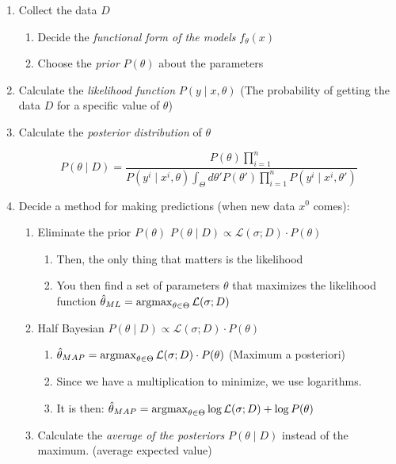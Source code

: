 \begin{enumerate}
	\item
	      Collect the data \(D\)

	      \begin{enumerate}
		      \item
		            Decide the \emph{functional form of the models} \(f_\theta (x)\)
		      \item
		            Choose the \emph{prior} \(P(\theta)\) about the parameters
	      \end{enumerate}
	\item
	      Calculate the \emph{likelihood function} \(P(y \mid x, \theta)\) (The
	      probability of getting the data \(D\) for a specific value of
	      \(\theta\))
	\item
	      Calculate the \emph{posterior distribution} of \(\theta\)

	      \[
		      P(\theta \mid D) = \frac{P(\theta) \prod_{i=1}^n}{P(y^i \mid x^i, \theta)
			      {\int_\Theta d\theta' P(\theta')\prod_{i=1}^n} P(y^i \mid x^i, \theta')}
	      \]

	\item
	      Decide a method for making predictions (when new data \(x^0\) comes):

	      \begin{enumerate}
		      \item Eliminate the prior \(P(\theta)\) \textrightarrow{}
		            \(P(\theta  \mid D) \propto \mathcal{L}(\sigma ; D) \cdot P(\theta)\)

		            \begin{enumerate}
			            \item
			                  Then, the only thing that matters is the likelihood
			            \item
			                  You then find a set of parameters \(\theta\) that maximizes the
			                  likelihood function
			                  \(\hat{\theta}_{ML} = \operatorname{argmax}_{\theta \in \Theta} \mathcal{L}(\sigma ; D)\)
		            \end{enumerate}
		      \item
		            Half Bayesian
		            \(P(\theta \mid D) \propto \mathcal{L}(\sigma ; D) \cdot P(\theta)\)

		            \begin{enumerate}
			            \item
			                  \(\hat{\theta}_{MAP} = \operatorname{argmax}_{\theta \in \Theta} \mathcal{L}(\sigma ; D) \cdot P(\theta)\)
			                  (Maximum a posteriori)
			            \item
			                  Since we have a multiplication to minimize, we use logarithms.
			            \item
			                  It is then:
			                  \(\hat{\theta}_{MAP} = \operatorname{argmax}_{\theta \in \Theta} \log \mathcal{L}(\sigma ; D) + \log P(\theta)\)
		            \end{enumerate}
		      \item
		            Calculate the \emph{average of the posteriors} \(P(\theta \mid D)\)
                instead of the maximum. (average \textrightarrow{} expected value)


\end{enumerate}
\end{enumerate}
